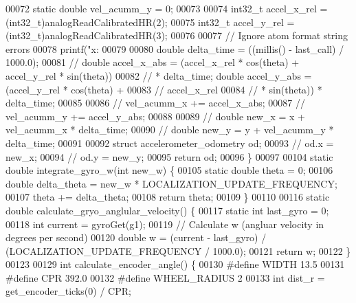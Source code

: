 \begin{DoxyCode}
{00072   \textcolor{keyword}{static} \textcolor{keywordtype}{double} vel\_acumm\_y = 0;
00073 
00074   int32\_t accel\_x\_rel = (int32\_t)analogReadCalibratedHR(2);
00075   int32\_t accel\_y\_rel = (int32\_t)analogReadCalibratedHR(3);
00076 
00077   \textcolor{comment}{// Ignore atom format string errors}
00078   printf(\textcolor{stringliteral}{"x: %
00079 
00080   \textcolor{keywordtype}{double} delta\_time = ((millis() - last_call) / 1000.0);
00081   \textcolor{comment}{// double accel\_x\_abs = (accel\_x\_rel *  cos(theta) + accel\_y\_rel * sin(theta))}
00082   \textcolor{comment}{// * delta\_time;  double accel\_y\_abs = (accel\_y\_rel *  cos(theta) +}
00083   \textcolor{comment}{// accel\_x\_rel}
00084   \textcolor{comment}{// * sin(theta)) * delta\_time;}
00085 
00086   \textcolor{comment}{// vel\_acumm\_x += accel\_x\_abs;}
00087   \textcolor{comment}{// vel\_acumm\_y += accel\_y\_abs;}
00088 
00089   \textcolor{comment}{// double new\_x = x + vel\_acumm\_x * delta\_time;}
00090   \textcolor{comment}{// double new\_y = y + vel\_acumm\_y * delta\_time;}
00091 
00092   \textcolor{keyword}{struct }accelerometer_odometry od;
00093   \textcolor{comment}{// od.x = new\_x;}
00094   \textcolor{comment}{// od.y = new\_y;}
00095   \textcolor{keywordflow}{return} od;
00096 \}
00097 
00104 \textcolor{keyword}{static} \textcolor{keywordtype}{double} integrate_gyro_w(\textcolor{keywordtype}{int} new\_w) \{
00105   \textcolor{keyword}{static} \textcolor{keywordtype}{double} theta = 0;
00106   \textcolor{keywordtype}{double} delta\_theta = new\_w * LOCALIZATION\_UPDATE\_FREQUENCY;
00107   theta += delta\_theta;
00108   \textcolor{keywordflow}{return} theta;
00109 \}
00110 
00116 \textcolor{keyword}{static} \textcolor{keywordtype}{double} calculate_gryo_anglular_velocity() \{
00117   \textcolor{keyword}{static} \textcolor{keywordtype}{int} last\_gyro = 0;
00118   \textcolor{keywordtype}{int} current = gyroGet(g1);
00119   \textcolor{comment}{// Calculate w (angluar velocity in degrees per second)}
00120   \textcolor{keywordtype}{double} w = (current - last\_gyro) / (LOCALIZATION\_UPDATE\_FREQUENCY / 1000.0);
00121   \textcolor{keywordflow}{return} w;
00122 \}
00123 
00129 \textcolor{keywordtype}{int} calculate_encoder_angle() \{
00130 \textcolor{preprocessor}{#define WIDTH 13.5}
00131 \textcolor{preprocessor}{#define CPR 392.0}
00132 \textcolor{preprocessor}{#define WHEEL\_RADIUS 2}
00133   \textcolor{keywordtype}{int} dist\_r = get_encoder_ticks(0) / CPR;
}}
\end{DoxyCode}
